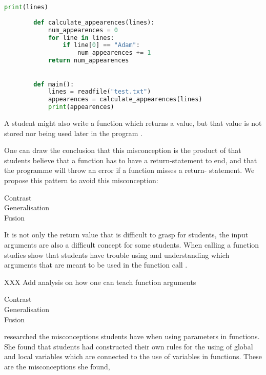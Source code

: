 \begin{enumerate}
\begin{lstlisting}[language=Python]
            print(lines)
            
        def calculate_appearences(lines):
            num_appearences = 0
            for line in lines:
                if line[0] == "Adam":
                    num_appearences += 1
            return num_appearences
            

        def main():
            lines = readfile("test.txt")
            appearences = calculate_appearences(lines)
            print(appearences)
    \end{lstlisting}
    
\end{enumerate}

A student might also write a function which returns a value, but that value 
is not stored nor being used later in the program 
\parencite{AltadmriBrown2015}.


One can draw the conclusion that this misconception is the product of that 
students believe that a function has to have a return-statement to end, and 
that the programme will throw an error if a function misses a return-
statement. We propose this pattern to avoid this misconception:

\begin{description}
    \item[Contrast]
    \item[Generalisation]
    \item[Fusion]
\end{description}

It is not only the return value that is difficult to grasp for students, the 
input arguments are also a difficult concept for some students. When 
calling a 
function studies show that students have trouble using and understanding 
which 
arguments that are meant to be used in the function call 
\parencite{AltadmriBrown2015}. 

XXX Add analysis on how one can teach function arguments

\begin{description}
    \item[Contrast]
    \item[Generalisation]
    \item[Fusion]
\end{description}


\Textcite{Fleury1991} researched the 
misconceptions students have when using parameters in functions.
She found that students had constructed their own rules for the using 
of global and local variables which are connected to the use of variables in 
functions. These are the misconceptions she found, 

